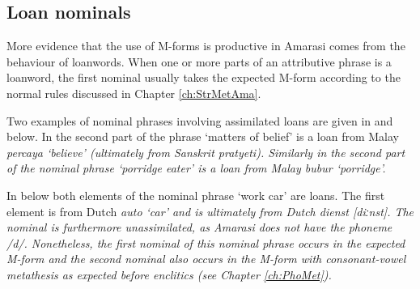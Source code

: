 \subsection{Loan nominals}\label{sec:LoaNou}
More evidence that the use of M-forms is productive in Amarasi
comes from the behaviour of loanwords.
When one or more parts of an attributive phrase is a loanword,
the first nominal usually takes the expected M-form according
to the normal rules discussed in Chapter \ref{ch:StrMetAma}.

Two examples of nominal phrases involving assimilated loans
are given in  and  below.
In  the second part of the phrase  `matters of belief'
is a loan from Malay \it{percaya} `believe' (ultimately from Sanskrit \it{pratyeti}).
Similarly in  the second part of the nominal phrase 
`porridge eater' is a loan from Malay \it{bubur} `porridge'.

\begin{exe}
	\label{ex:130921-1, 1.35}
	\label{ex:130825-6, 17.02}
\end{exe}

In  below both elements of the nominal phrase  `work car'
are loans. The first element  is from Dutch \it{auto} `car'
and  is ultimately from Dutch \it{dienst} [diːnst].
The nominal  is furthermore unassimilated,
as Amarasi does not have the phoneme /d/.
Nonetheless, the first nominal of this nominal phrase occurs in the expected M-form
and the second nominal also occurs in the M-form 
with consonant-vowel metathesis as expected before enclitics (see Chapter \ref{ch:PhoMet}).

